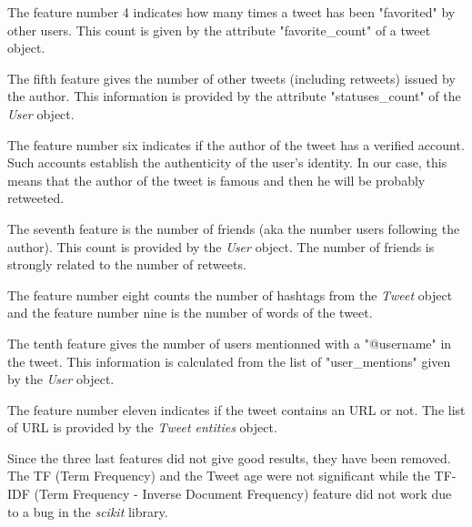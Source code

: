 The feature number 4 indicates how many times a tweet has been "favorited" by 
other users. This count is given by the attribute "favorite\_count"  of a tweet 
object.

The fifth feature gives the number of other tweets (including retweets) issued 
by the author. This information is provided by the attribute "statuses\_count" 
of the \emph{User} object.

The feature number six indicates if the author of the tweet has a verified 
account. Such accounts establish the authenticity of the user's identity. In 
our case, this means that the author of the tweet is famous and then he will be 
probably retweeted.

The seventh feature is the number of friends (aka the number users following 
the author). This count is provided by the \emph{User} object. The number of 
friends is strongly related to the number of retweets.

The feature number eight counts the number of hashtags from the \emph{Tweet} 
object and the feature number nine is the number of words of the tweet.

The tenth feature gives the number of users mentionned with a "@username" in 
the tweet. This information is calculated from the list of "user\_mentions" 
given by the \emph{User} object.

The feature number eleven indicates if the tweet contains an URL or not. The 
list of URL is provided by the \emph{Tweet entities} object.

Since the three last features did not give good results, they have been 
removed. The TF (Term Frequency) and the Tweet age were not significant while 
the TF-IDF (Term Frequency - Inverse Document Frequency) feature did not work 
due to a bug in the \emph{scikit} library.